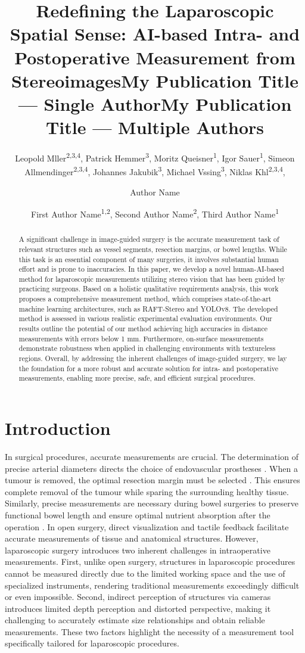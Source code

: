 \documentclass[letterpaper]{article} %
\title{Redefining the Laparoscopic Spatial Sense: AI-based Intra- and Postoperative Measurement from Stereoimages}
\author{
    Leopold Mller\textsuperscript{\rm 2,3,4},
    Patrick Hemmer\textsuperscript{\rm 3},
    Moritz Queisner\textsuperscript{\rm 1},
    Igor Sauer\textsuperscript{\rm 1},
    Simeon Allmendinger\textsuperscript{\rm 2,3,4},
    Johannes Jakubik\textsuperscript{\rm 3},
    Michael Vssing\textsuperscript{\rm 3},
    Niklas Khl\textsuperscript{\rm 2,3,4},\\
}
\title{My Publication Title --- Single Author}
\author {
    Author Name
}
\title{My Publication Title --- Multiple Authors}
\author {
    First Author Name\textsuperscript{\rm 1,\rm 2},
    Second Author Name\textsuperscript{\rm 2},
    Third Author Name\textsuperscript{\rm 1}
}
\begin{document}
\maketitle

\begin{abstract}
A significant challenge in image-guided surgery is the accurate measurement task of relevant structures such as vessel segments, resection margins, or bowel lengths. While this task is an essential component of many surgeries, it involves substantial human effort and is prone to inaccuracies. In this paper, we develop a novel human-AI-based method for laparoscopic measurements utilizing stereo vision that has been guided by practicing surgeons. Based on a holistic qualitative requirements analysis, this work proposes a comprehensive measurement method, which comprises state-of-the-art machine learning architectures, such as RAFT-Stereo and YOLOv8. The developed method is assessed in various realistic experimental evaluation environments. Our results outline the potential of our method achieving high accuracies in distance measurements with errors below 1 mm. Furthermore, on-surface measurements demonstrate robustness when applied in challenging environments with textureless regions. Overall, by addressing the inherent challenges of image-guided surgery, we lay the foundation for a more robust and accurate solution for intra- and postoperative measurements, enabling more precise, safe, and efficient surgical procedures.
\end{abstract}

\section{Introduction}

In surgical procedures, accurate measurements are crucial. The determination of precise arterial diameters directs the choice of endovascular prostheses \cite{carvalho_measuring_2006}. When a tumour is removed, the optimal resection margin must be selected \cite{Bilgeri2020TheEO}. This ensures complete removal of the tumour while sparing the surrounding healthy tissue. Similarly, precise measurements are necessary during bowel surgeries to preserve functional bowel length and ensure optimal nutrient absorption after the operation \cite{Gazer2017AccuracyAI}. In open surgery, direct visualization and tactile feedback facilitate accurate measurements of tissue and anatomical structures. However, laparoscopic surgery introduces two inherent challenges in intraoperative measurements. First, unlike open surgery, structures in laparoscopic procedures cannot be measured directly due to the limited working space and the use of specialized instruments, rendering traditional measurements exceedingly difficult or even impossible. Second, indirect perception of structures via cameras introduces limited depth perception and distorted perspective, making it challenging to accurately estimate size relationships and obtain reliable measurements. These two factors highlight the necessity of a measurement tool specifically tailored for laparoscopic procedures.
\end{document}
